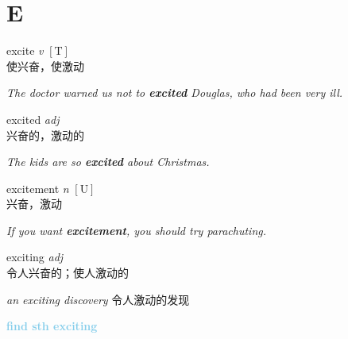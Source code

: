 \section{E}

\item[] {
    \lettrine{excite}{}  
    \textit{v} 
    $\mathrm{[T]}$ \\
    使兴奋，使激动

    \textit{The doctor warned us not to \textbf{excited} Douglas, who had been very ill.}

} 

\item[] {
    \lettrine{excited}{}  
    \textit{adj} \\
    兴奋的，激动的

    \textit{The kids are so \textbf{excited} about Christmas.}

} 

\item[] {
    \lettrine{excitement}{}  
    \textit{n} 
    $\mathrm{[U]}$ \\
    兴奋，激动

    \textit{If you want \textbf{excitement}, you should try parachuting.}

} 

\item[] {
    \lettrine{exciting}{}  
    \textit{adj} \\
    令人兴奋的；使人激动的

    \textit{an exciting discovery} 令人激动的发现

    \textbf {
        \textcolor{SkyBlue} {
            find sth exciting
        }
    }

} 